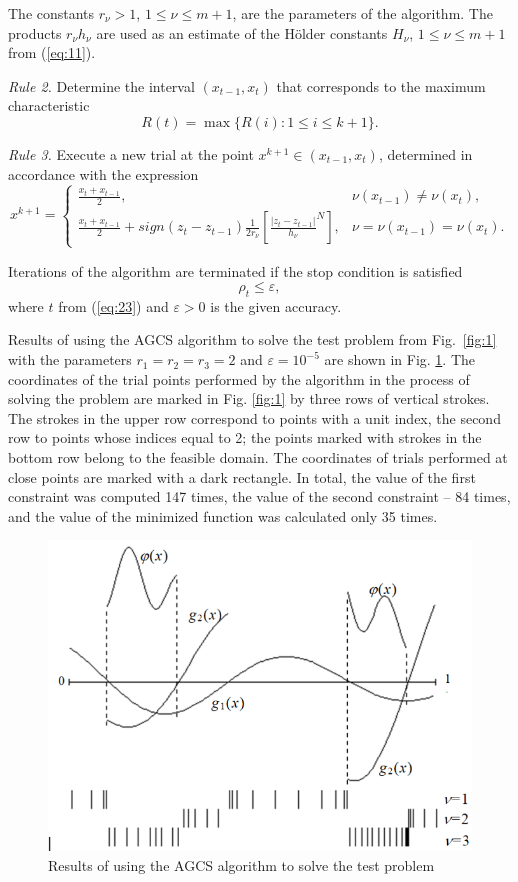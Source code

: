 \documentclass[smallextended]{svjour3}       %
\begin{document}
The constants $r_\nu>1$, $1\leq \nu \leq m+1$, are the parameters of the algorithm. The products $r_\nu h_\nu$ are used as an estimate of the H\"older constants $H_\nu$, $1\leq \nu \leq m+1$ from (\ref{eq:11}).

\textit{Rule 2.} Determine the interval $(x_{t-1},x_t)$ that corresponds to the maximum characteristic
\begin{equation}\label{eq:23}
R(t) = \max{\{R(i):1 \leq i \leq k+1\}}.
\end{equation}

\textit{Rule 3.} Execute a new trial at the point $x^{k+1} \in (x_{t-1},x_t)$, determined in accordance with the expression
\begin{equation}\label{eq:24}
x^{k+1} = 
 \begin{cases}
   \frac{x_t+x_{t-1}}{2}, & \nu(x_{t-1}) \neq \nu(x_t), \\
   \frac{x_t+x_{t-1}}{2} + sign(z_t - z_{t-1}) \frac{1}{2r_\nu}[ \frac{|z_t - z_{t-1}|}{h_\nu}^N ], & \nu = \nu(x_{t-1}) = \nu(x_t).
 \end{cases}
\end{equation}

Iterations of the algorithm are terminated if the stop condition is satisfied
\begin{equation}\label{eq:25}
\rho_t\leq \varepsilon,
\end{equation}
where $t$ from (\ref{eq:23}) and $\varepsilon > 0$ is the given accuracy.

Results of using the AGCS algorithm to solve the test problem from Fig.~\ref{fig:1} with the parameters $r_1=r_2=r_3=2$ and $\varepsilon=10^{-5}$ are shown in Fig. \ref{fig:2}.  The coordinates of the trial points performed by the algorithm in the process of solving the problem are marked in Fig. \ref{fig:1} by three rows of vertical strokes. The strokes in the upper row correspond to points with a unit index, the second row to points whose indices equal to 2; the points marked with strokes in the bottom row belong to the feasible domain. The coordinates of trials performed at close points are marked with a dark rectangle. In total, the value of the first constraint was computed 147 times, the value of the second constraint -- 84 times, and the value of the minimized function was calculated only 35 times.

\begin{figure}
  \centering
  \includegraphics[width=0.6\linewidth]{fig2}
  \caption{Results of using the AGCS algorithm to solve the test problem}
  \label{fig:2}
\end{figure}
\end{document}
